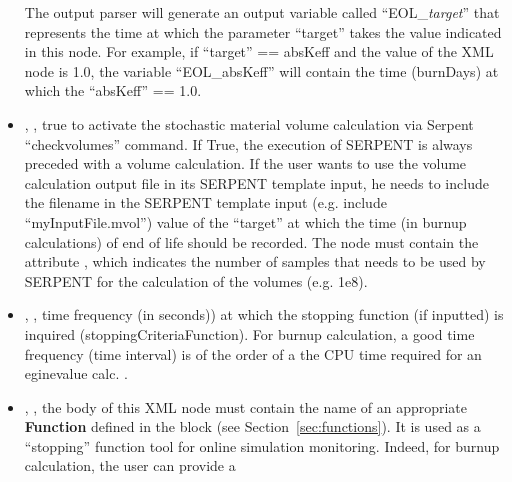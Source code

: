 \begin{itemize}
                                                              \nb  The output parser will generate an output variable called ``EOL\_\textit{target}'' that represents the time at which the 
                                                              parameter ``target'' takes the value indicated in this node. For example,  if ``target'' == absKeff and the value of the XML node is 1.0, 
                                                              the variable ``EOL\_absKeff'' will contain the time (burnDays) at which the ``absKeff'' == 1.0.
   \item {}, ,  true to activate the stochastic material volume calculation via Serpent ``checkvolumes'' command. If True, the execution of 
                                                             SERPENT is always preceded with a volume calculation. If the user wants to use the volume calculation output file in its SERPENT template input, he needs to include 
                                                             the filename in the SERPENT template input (e.g. include ``myInputFile.mvol'')  value of the ``target'' at which the time (in burnup calculations) of end of life should be recorded.
                                                             The   node  must contain the attribute , which indicates the number of samples that needs to be used by SERPENT for the calculation of the volumes (e.g. 1e8).
   \item {}, , time frequency (in seconds)) at which  the stopping function (if inputted)
                                                            is inquired (stoppingCriteriaFunction).
                                                            For burnup calculation, a good time frequency (time interval) is of the order of a the CPU time
                                                            required for an eginevalue calc. .
   \item {}, ,   the
                                                           body of this XML node must contain the name of an appropriate \textbf{Function} defined in the
                                                             block (see Section~\ref{sec:functions}).  It is used as a
                                                           ``stopping'' function tool for online simulation monitoring. Indeed, for burnup calculation, the user can provide a

\end{itemize}

